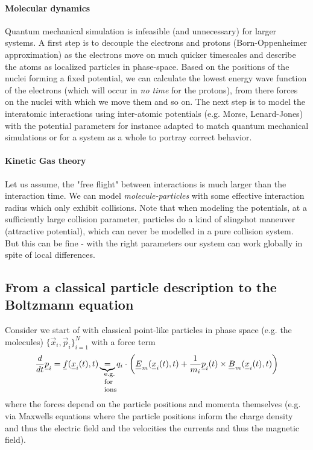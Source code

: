 \paragraph{Molecular dynamics} Quantum mechanical simulation is infeasible (and unnecessary)
for larger systems. A first step is to decouple the electrons and protons (Born-Oppenheimer approximation)
as the electrons move on much quicker timescales and describe the atoms as localized particles in phase-space.
Based on the positions of the nuclei forming a fixed potential, we can calculate the lowest energy wave function
of the electrons (which will occur in \textit{no time} for the protons), from there forces on the nuclei with which
we move them and so on. The next step is to model the interatomic interactions using inter-atomic potentials (e.g. Morse, Lenard-Jones)
with the potential parameters for instance adapted to match quantum mechanical simulations or for a system as a whole to portray
correct behavior.

\paragraph{Kinetic Gas theory} Let us assume, the "free flight" between interactions is much larger
than the interaction time. We can model \textit{molecule-particles} with some effective interaction
radius which only exhibit collisions. Note that when modeling the potentials, at a sufficiently
large collision parameter, particles do a kind of slingshot maneuver (attractive potential), which
can never be modelled in a pure collision system. But this can be fine - with the right parameters
our system can work globally in spite of local differences. 

\subsection{From a classical particle description to the Boltzmann equation}
\label{subsec:particle_to_boltzmann}

Consider we start of with classical point-like particles in phase space (e.g. the molecules) $\{ \vec{x}_i,\vec{p}_i \}_{i=1}^N$ with a force term
\begin{equation}
    \frac{d}{dt}\vec{p}_i = \vec{f}(\vec{x}_i(t),t) \explain{=}{e.g. for ions} q_i \cdot \left( \vec{E}_m(\vec{x}_i(t),t) + \frac{1}{m_i} \vec{p}_i(t) \times \vec{B}_m (\vec{x}_i(t),t) \right)  
\end{equation}
where the forces depend on the particle positions and momenta themselves (e.g. via Maxwells equations where the particle positions inform the charge
density and thus the electric field and the velocities the currents and thus the magnetic field).

